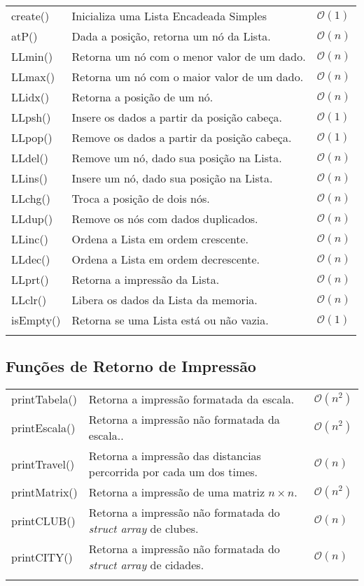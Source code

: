 \documentclass[12pt,a4paper]{article}
\numberwithin{figure}{section}
\numberwithin{table}{section}
\begin{document}
\begin{longtable}{>{\ttfamily}p{3cm} p{11cm} p{1cm}}
	create() & Inicializa uma Lista Encadeada Simples & $\mathcal{O}(1)$ \\
	atP()   & Dada a posição, retorna um nó da Lista. & $\mathcal{O}(n)$ \\
	LLmin() & Retorna um nó com o menor valor de um dado. & $\mathcal{O}(n)$ \\
	LLmax() & Retorna um nó com o maior valor de um dado. & $\mathcal{O}(n)$ \\
	LLidx() & Retorna a posição de um nó. & $\mathcal{O}(n)$ \\
	LLpsh() & Insere os dados a partir da posição cabeça. & $\mathcal{O}(1)$ \\
	LLpop() & Remove os dados a partir da posição cabeça. & $\mathcal{O}(1)$ \\
	LLdel() & Remove um nó, dado sua posição na Lista. & $\mathcal{O}(n)$ \\
	LLins() & Insere um nó, dado sua posição na Lista. & $\mathcal{O}(n)$ \\
	LLchg() & Troca a posição de dois nós. & $\mathcal{O}(n)$ \\
	LLdup() & Remove os nós com dados duplicados. & $\mathcal{O}(n)$ \\
	LLinc() & Ordena a Lista em ordem crescente. & $\mathcal{O}(n)$ \\
	LLdec() & Ordena a Lista em ordem decrescente. & $\mathcal{O}(n)$ \\
	LLprt() & Retorna a impressão da Lista. & $\mathcal{O}(n)$ \\
	LLclr()  & Libera os dados da Lista da memoria. & $\mathcal{O}(n)$ \\
	isEmpty() & Retorna se uma Lista está ou não vazia. & $\mathcal{O}(1)$ \\
	\label{tab:lista}
\end{longtable}
\vspace{-0.5cm}

\subsection{Funções de Retorno de Impressão}
	
\begin{longtable}{>{\ttfamily}p{3cm} p{11cm} p{1cm}}
	printTabela() & Retorna a impressão formatada da escala. & $\mathcal{O}(n^2)$ \\
	printEscala() & Retorna a impressão não formatada da escala.. & $\mathcal{O}(n^2)$ \\
	printTravel() & Retorna a impressão das distancias percorrida por cada um dos times. & $\mathcal{O}(n)$ \\
	printMatrix() & Retorna a impressão de uma matriz $n \times n$. & $\mathcal{O}(n^2)$ \\
	printCLUB() & Retorna a impressão não formatada do \textit{struct array} de clubes. & $\mathcal{O}(n)$ \\
	printCITY() & Retorna a impressão não formatada do \textit{struct array} de cidades. & $\mathcal{O}(n)$ \\
	\label{tab:print}
\end{longtable}
\vspace{-0.5cm}
\end{document}
